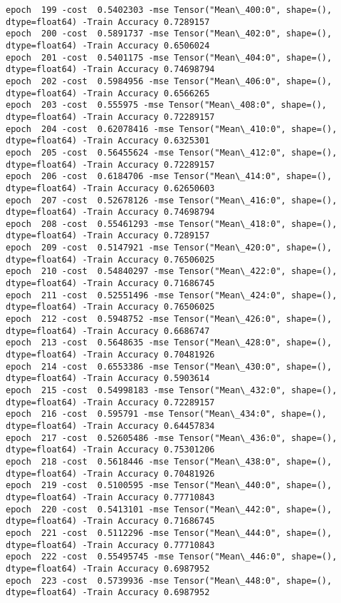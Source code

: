 \documentclass[11pt]{article}
\begin{document}
\begin{Verbatim}[commandchars=\\\{\}]
epoch  199 -cost  0.5402303 -mse Tensor("Mean\_400:0", shape=(), dtype=float64) -Train Accuracy 0.7289157
epoch  200 -cost  0.5891737 -mse Tensor("Mean\_402:0", shape=(), dtype=float64) -Train Accuracy 0.6506024
epoch  201 -cost  0.5401175 -mse Tensor("Mean\_404:0", shape=(), dtype=float64) -Train Accuracy 0.74698794
epoch  202 -cost  0.5984956 -mse Tensor("Mean\_406:0", shape=(), dtype=float64) -Train Accuracy 0.6566265
epoch  203 -cost  0.555975 -mse Tensor("Mean\_408:0", shape=(), dtype=float64) -Train Accuracy 0.72289157
epoch  204 -cost  0.62078416 -mse Tensor("Mean\_410:0", shape=(), dtype=float64) -Train Accuracy 0.6325301
epoch  205 -cost  0.56455624 -mse Tensor("Mean\_412:0", shape=(), dtype=float64) -Train Accuracy 0.72289157
epoch  206 -cost  0.6184706 -mse Tensor("Mean\_414:0", shape=(), dtype=float64) -Train Accuracy 0.62650603
epoch  207 -cost  0.52678126 -mse Tensor("Mean\_416:0", shape=(), dtype=float64) -Train Accuracy 0.74698794
epoch  208 -cost  0.55461293 -mse Tensor("Mean\_418:0", shape=(), dtype=float64) -Train Accuracy 0.7289157
epoch  209 -cost  0.5147921 -mse Tensor("Mean\_420:0", shape=(), dtype=float64) -Train Accuracy 0.76506025
epoch  210 -cost  0.54840297 -mse Tensor("Mean\_422:0", shape=(), dtype=float64) -Train Accuracy 0.71686745
epoch  211 -cost  0.52551496 -mse Tensor("Mean\_424:0", shape=(), dtype=float64) -Train Accuracy 0.76506025
epoch  212 -cost  0.5948752 -mse Tensor("Mean\_426:0", shape=(), dtype=float64) -Train Accuracy 0.6686747
epoch  213 -cost  0.5648635 -mse Tensor("Mean\_428:0", shape=(), dtype=float64) -Train Accuracy 0.70481926
epoch  214 -cost  0.6553386 -mse Tensor("Mean\_430:0", shape=(), dtype=float64) -Train Accuracy 0.5903614
epoch  215 -cost  0.54998183 -mse Tensor("Mean\_432:0", shape=(), dtype=float64) -Train Accuracy 0.72289157
epoch  216 -cost  0.595791 -mse Tensor("Mean\_434:0", shape=(), dtype=float64) -Train Accuracy 0.64457834
epoch  217 -cost  0.52605486 -mse Tensor("Mean\_436:0", shape=(), dtype=float64) -Train Accuracy 0.75301206
epoch  218 -cost  0.5618446 -mse Tensor("Mean\_438:0", shape=(), dtype=float64) -Train Accuracy 0.70481926
epoch  219 -cost  0.5100595 -mse Tensor("Mean\_440:0", shape=(), dtype=float64) -Train Accuracy 0.77710843
epoch  220 -cost  0.5413101 -mse Tensor("Mean\_442:0", shape=(), dtype=float64) -Train Accuracy 0.71686745
epoch  221 -cost  0.5112296 -mse Tensor("Mean\_444:0", shape=(), dtype=float64) -Train Accuracy 0.77710843
epoch  222 -cost  0.55495745 -mse Tensor("Mean\_446:0", shape=(), dtype=float64) -Train Accuracy 0.6987952
epoch  223 -cost  0.5739936 -mse Tensor("Mean\_448:0", shape=(), dtype=float64) -Train Accuracy 0.6987952

\end{Verbatim}
\end{document}
